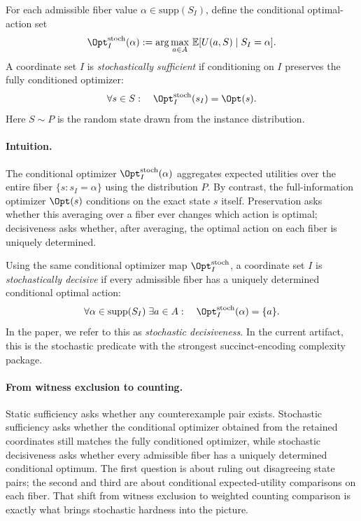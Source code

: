 \begin{definition}\label{def:stochastic-sufficient}
For each admissible fiber value $\alpha \in \mathrm{supp}(S_I)$, define the conditional optimal-action set
\[
\Opt^{\mathrm{stoch}}_I(\alpha)
:=
\arg\max_{a\in A}\,\mathbb{E}[U(a,S)\mid S_I = \alpha].
\]
A coordinate set $I$ is \emph{stochastically sufficient} if conditioning on $I$ preserves the fully conditioned optimizer:
\[
\forall s \in S:\quad \Opt^{\mathrm{stoch}}_I(s_I)=\Opt(s).
\]
Here $S \sim P$ is the random state drawn from the instance distribution.
\end{definition}

\paragraph{Intuition.}
The conditional optimizer $\Opt^{\mathrm{stoch}}_I(\alpha)$ aggregates expected utilities over the entire fiber $\{s : s_I = \alpha\}$ using the distribution $P$. By contrast, the full-information optimizer $\Opt(s)$ conditions on the exact state $s$ itself. Preservation asks whether this averaging over a fiber ever changes which action is optimal; decisiveness asks whether, after averaging, the optimal action on each fiber is uniquely determined.

\begin{definition}\label{def:stochastic-singleton-sufficient}
Using the same conditional optimizer map $\Opt^{\mathrm{stoch}}_I$, a coordinate set $I$ is \emph{stochastically decisive} if every admissible fiber has a uniquely determined conditional optimal action:
\[
\forall \alpha \in \mathrm{supp}(S_I)\; \exists a \in A:\quad \Opt^{\mathrm{stoch}}_I(\alpha)=\{a\}.
\]
In the paper, we refer to this as \emph{stochastic decisiveness}. In the current artifact, this is the stochastic predicate with the strongest succinct-encoding complexity package.
\end{definition}

\paragraph{From witness exclusion to counting.}
Static sufficiency asks whether any counterexample pair exists. Stochastic sufficiency asks whether the conditional optimizer obtained from the retained coordinates still matches the fully conditioned optimizer, while stochastic decisiveness asks whether every admissible fiber has a uniquely determined conditional optimum. The first question is about ruling out disagreeing state pairs; the second and third are about conditional expected-utility comparisons on each fiber. That shift from witness exclusion to weighted counting comparison is exactly what brings stochastic hardness into the picture.

